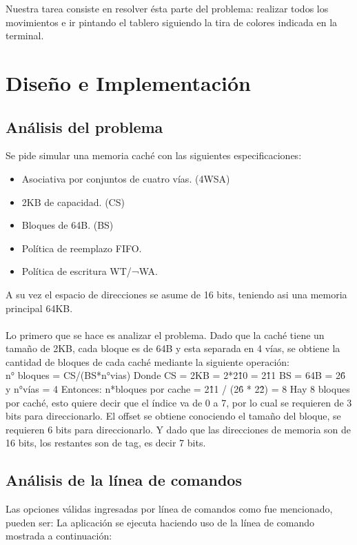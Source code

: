 \documentclass[a4paper, 10pt, twoside, notitlepage]{article}
\begin{document}
Nuestra tarea consiste en resolver ésta parte del problema: realizar todos los movimientos e ir pintando el tablero siguiendo la tira de colores indicada en la terminal.



\section{Diseño e Implementación}

\subsection{Análisis del problema}
Se pide simular una memoria caché con las siguientes especificaciones:\\
\begin{itemize}
    \item Asociativa por conjuntos de cuatro vías. (4WSA)
    \item 2KB de capacidad. (CS)
    \item Bloques de 64B. (BS)
    \item Política de reemplazo FIFO.
    \item Política de escritura WT/¬WA.
\end{itemize}
A su vez el espacio de direcciones se asume de 16 bits, teniendo asi una memoria principal 64KB.\\
\\ 
Lo primero que se hace es analizar el problema. Dado que la caché tiene un tamaño de 2KB, cada bloque es de 64B y esta separada en 4 vías, se obtiene la cantidad de bloques de cada caché mediante la siguiente operación:\\
n° bloques = CS/(BS*n°vias)
Donde CS = 2KB = 2*2\^10 = 2\^11
BS = 64B = 2\^6
y n°vías = 4
Entonces: n*bloques por cache = 2\^11 / (2\^6 * 2\^2) = 8
Hay 8 bloques por caché, esto quiere decir que el índice va de 0 a 7, por lo cual se requieren de 3 bits para direccionarlo. El offset se obtiene conociendo el tamaño del bloque, se requieren 6 bits para direccionarlo. Y dado que las direcciones de memoria son de 16 bits, los restantes son de tag, es decir 7 bits. 


\subsection{Análisis de la línea de comandos}
Las opciones válidas ingresadas por línea de comandos como fue mencionado, pueden ser:
La aplicación se ejecuta haciendo uso de la línea de comando mostrada a continuación:
\end{document}
